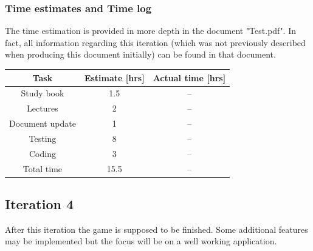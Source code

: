 \documentclass[12pt, letterpaper]{article}
\begin{document}
\subsubsection{Time estimates and Time log}
The time estimation is provided in more depth in the document "Test.pdf". In fact, all information regarding this iteration (which was not previously described when producing this document initially) can be found in that document.
\begin{center}
	\begin{tabular}{|c|c|c|} 
		\hline
		Task & Estimate [hrs] & Actual time [hrs]\\ [0.5ex] 
		\hline\hline
		Study book & 1.5 & --\\
		\hline
		Lectures & 2 & -- \\
		\hline 
		Document update & 1 & -- \\
		\hline 
		Testing & 8 & --\\
		\hline
		Coding & 3 & --\\ 
		\hline
		Total time & 15.5 & -- \\ [1ex]
		\hline 
	\end{tabular}
\end{center}
\subsection{Iteration 4}
After this iteration the game is supposed to be finished. Some additional features may be implemented but the focus will be on a well working application.
\end{document}
